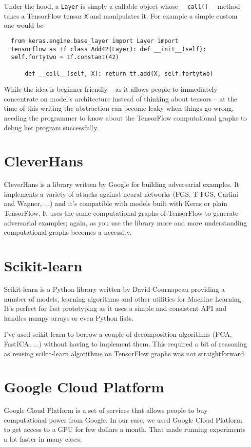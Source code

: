Under the hood, a \texttt{Layer} is simply a callable object
whose \texttt{\_\_call()\_\_} method takes a TensorFlow
tensor \texttt{X} and manipulates it. For example a simple
custom one would be
\begin{verbatim}
  from keras.engine.base_layer import Layer import
  tensorflow as tf class Add42(Layer): def __init__(self):
  self.fortytwo = tf.constant(42)

      def __call__(self, X): return tf.add(X, self.fortytwo)
\end{verbatim}

While the idea is beginner friendly -- as it allows people
to immediately concentrate on model's architecture instead
of thinking about tensors -- at the time of this writing the
abstraction can become leaky when things go wrong, needing
the programmer to know about the TensorFlow computational
graphs to debug her program successfully.

\section{CleverHans}
\label{sec:cleverhans}

CleverHans is a library written by Google for building
adversarial examples. It implements a variety of attacks
against neural networks (FGS, T-FGS, Carlini and Wagner,
...) and it's compatible with models built with Keras or
plain TensorFlow. It uses the same computational graphs of
TensorFlow to generate adversarial examples; again, as you
use the library more and more understanding computational
graphs becomes a necessity.

\section{Scikit-learn}
\label{sec:sklearn}

Scikit-learn is a Python library written by David Cournapeau
providing a number of models, learning algorithms and other
utilities for Machine Learning. It's perfect for fast
prototyping as it uses a simple and consistent API and
handles numpy arrays or even Python lists.

I've used scikit-learn to borrow a couple of decomposition
algorithms (PCA, FastICA, ...) without having to implement
them. This required a bit of reasoning as reusing
scikit-learn algorithms on TensorFlow graphs was not
straightforward.

\section{Google Cloud Platform}
\label{sec:google-cloud-platform}

Google Cloud Platform is a set of services that allows
people to buy computational power from Google. In our case,
we used Google Cloud Platform to get access to a GPU for few
dollars a month. That made running experiments a lot faster
in many cases.
